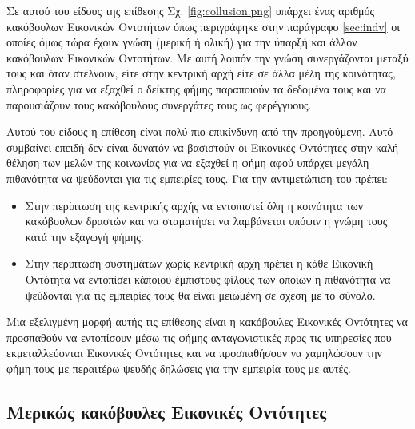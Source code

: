 Σε αυτού του είδους της επίθεσης Σχ. \ref{fig:collusion.png} υπάρχει ένας αριθμός κακόβουλων Εικονικών Οντοτήτων όπως περιγράφηκε στην παράγραφο \ref{sec:indv} οι οποίες όμως τώρα έχουν γνώση (μερική ή ολική) για την ύπαρξή και άλλον κακόβουλων Εικονικών Οντοτήτων. Με αυτή λοιπόν την γνώση συνεργάζονται μεταξύ τους και όταν στέλνουν, είτε στην κεντρική αρχή είτε σε άλλα μέλη της κοινότητας, πληροφορίες για να εξαχθεί ο δείκτης φήμης παραποιούν τα δεδομένα τους και να παρουσιάζουν τους κακόβουλους συνεργάτες τους ως φερέγγυους.


Αυτού του είδους η επίθεση είναι πολύ πιο επικίνδυνη από την προηγούμενη. Αυτό συμβαίνει επειδή δεν είναι δυνατόν να βασιστούν οι Εικονικές Οντότητες στην καλή θέληση των μελών της κοινωνίας για να εξαχθεί η φήμη αφού υπάρχει μεγάλη πιθανότητα να ψεύδονται για τις εμπειρίες τους. Για την αντιμετώπιση του πρέπει: \begin{itemize}
\item Στην περίπτωση της κεντρικής αρχής να εντοπιστεί όλη η κοινότητα των κακόβουλων δραστών και να σταματήσει να λαμβάνεται υπόψιν η γνώμη τους κατά την εξαγωγή φήμης.

\item Στην περίπτωση συστημάτων χωρίς κεντρική αρχή πρέπει η κάθε Εικονική Οντότητα να εντοπίσει κάποιου έμπιστους φίλους των οποίων η πιθανότητα να ψεύδονται για τις εμπειρίες τους θα είναι μειωμένη σε σχέση με το σύνολο.
\end{itemize}

Μια εξελιγμένη μορφή αυτής τις επίθεσης είναι η κακόβουλες Εικονικές Οντότητες να προσπαθούν να εντοπίσουν μέσω τις φήμης ανταγωνιστικές προς τις υπηρεσίες που εκμεταλλεύονται Εικονικές Οντότητες και να προσπαθήσουν να χαμηλώσουν την φήμη τους με περαιτέρω ψευδής δηλώσεις για την εμπειρία τους με αυτές.

\subsection{Μερικώς κακόβουλες Εικονικές Οντότητες}\label{sec:part}

